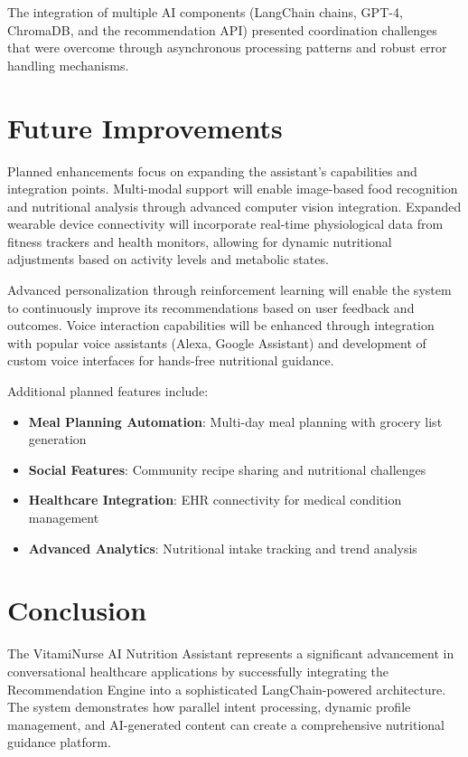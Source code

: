The integration of multiple AI components (LangChain chains, GPT-4, ChromaDB, and the recommendation API) presented coordination challenges that were overcome through asynchronous processing patterns and robust error handling mechanisms.

\section{Future Improvements}
Planned enhancements focus on expanding the assistant's capabilities and integration points. Multi-modal support will enable image-based food recognition and nutritional analysis through advanced computer vision integration. Expanded wearable device connectivity will incorporate real-time physiological data from fitness trackers and health monitors, allowing for dynamic nutritional adjustments based on activity levels and metabolic states.

Advanced personalization through reinforcement learning will enable the system to continuously improve its recommendations based on user feedback and outcomes. Voice interaction capabilities will be enhanced through integration with popular voice assistants (Alexa, Google Assistant) and development of custom voice interfaces for hands-free nutritional guidance.

Additional planned features include:
\begin{itemize}
\item \textbf{Meal Planning Automation}: Multi-day meal planning with grocery list generation
\item \textbf{Social Features}: Community recipe sharing and nutritional challenges
\item \textbf{Healthcare Integration}: EHR connectivity for medical condition management
\item \textbf{Advanced Analytics}: Nutritional intake tracking and trend analysis
\end{itemize}

\section{Conclusion}
The VitamiNurse AI Nutrition Assistant represents a significant advancement in conversational healthcare applications by successfully integrating the Recommendation Engine into a sophisticated LangChain-powered architecture. The system demonstrates how parallel intent processing, dynamic profile management, and AI-generated content can create a comprehensive nutritional guidance platform.

